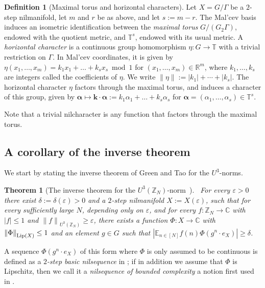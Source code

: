 \documentclass[11pt]{amsart}
\newtheorem{theorem}[lemma]{Theorem}
\theoremstyle{definition}
\newtheorem*{definition}{Definition}
\begin{document}
\begin{definition}[Maximal torus and horizontal characters]
Let $X=G/\Gamma$ be a $2$-step nilmanifold,  let $m$ and $r$ be as
above, and let $s:=m-r$.
 The Mal'cev basis induces an
isometric identification between the \emph{maximal torus}
$G/(G_2\Gamma)$, endowed with the quotient metric, and ${{\mathbb T}}^s$,
endowed with its usual metric. A \emph{horizontal character} is a
continuous group homomorphism $\eta\colon G\to{{\mathbb T}}$  with  a trivial
restriction on $\Gamma$.  In Mal'cev coordinates, it is given by $\eta(x_1,\dots, x_m)=k_1x_1+\dots+k_sx_s\bmod 1$ for $(x_1,\dots,x_m)\in {{\mathbb R}}^m$, where $k_1,\dots,k_s$ are integers called the coefficients of $\eta$.   We write ${\lVert {\eta} \rVert}:=|k_1|+\cdots+|k_s|$.
The horizontal character $\eta$ factors   through the maximal torus, and  induces a character of this group,  given by  ${{\boldsymbol{\alpha}}}\mapsto{{\mathbf{k}}}\cdot{{\boldsymbol{\alpha}}}:=k_1\alpha_1+\dots+k_s\alpha_s$ for
${{\boldsymbol{\alpha}}}=(\alpha_1,\dots,\alpha_s)\in{{\mathbb T}}^s$.

\end{definition}
 Note that a trivial  nilcharacter
is any function that factors through the maximal torus.

\subsection{A corollary of the inverse theorem}
We start by stating the  inverse theorem of Green and Tao for the $U^3$-norms.
\begin{theorem}[{The inverse theorem for the $U^3({{\mathbb Z}}_N)$-norm~\cite[Theorem 12.8]{GT08}}]
\label{th:inverse}\ For every  ${\varepsilon}>0$ there exist
$\delta:=\delta({\varepsilon})>0$ and a $2$-step nilmanifold $X:=X({\varepsilon})$, such
that for every  sufficiently large $N$, depending only on ${\varepsilon}$, and
for every $f\colon{{\mathbb Z}}_N\to{{\mathbb C}}$ with $|f|\leq 1$ and ${\lVert f \rVert}_{U^3({{\mathbb Z}}_N)}\geq{\varepsilon}$, there exists a function $\Phi\colon X\to{{\mathbb C}}$
with ${\lVert \Phi \rVert}_{{{\text{\rm Lip}}}(X)}\leq 1$ and an element $g\in G$ such that
$|{{\mathbb E}}_{n\in[N]}f(n)\Phi(g^n\cdot e_X)|\geq\delta$.
\end{theorem}
A sequence $\Phi(g^n\cdot e_X)$ of  this form where $\Phi$ is only
assumed to be continuous is defined as a \emph{$2$-step basic nilsequence} in
\cite{BHK05}; if in addition we assume  that $\Phi$ is Lipschitz, then
we call it a
\emph{nilsequence of bounded complexity} a notion first used in \cite{GT08}.
\end{document}
